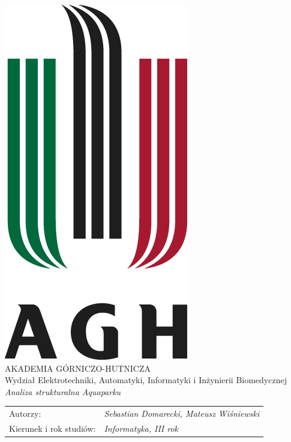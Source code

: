 \documentclass[12pt]{report}
\def\thesistable{
	\begin{tabular}{p{45mm}l}
		Autorzy: & {\itshape Sebastian Domarecki, Mateusz Wiśniewski}\\[-1mm]
		Kierunek i rok studi\'{o}w: & {\itshape {Informatyka, III rok}}\\
	\end{tabular}
}
\begin{document}
	\titlepage
	
\begin{center}
	\vspace*{1.5cm}
	\includegraphics[scale=0.6]{agh.jpg}\\
	\vspace*{2mm}
	\large AKADEMIA GÓRNICZO-HUTNICZA\\
	\vspace*{1mm}
	\large Wydział Elektrotechniki, Automatyki, Informatyki i Inżynierii Biomedycznej\\
	\vspace*{1cm}
	\sffamily\Large\itshape Analiza strukturalna Aquaparku
	
	\date{2017}
	
	\vspace{\fill}
\end{center}
	\noindent
	{\sffamily
		\thesistable
	}
	
	\tableofcontents
	
\end{document}
